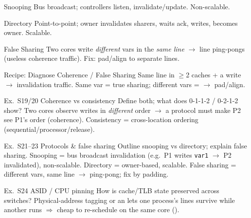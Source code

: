 \multend


\begin{concept}{Snooping}
    Bus broadcast; controllers listen, invalidate/update. Non-scalable.
\end{concept}

\begin{concept}{Directory}
    Point-to-point; owner invalidates sharers, waits ack, writes, becomes owner. Scalable.
\end{concept}

\multend

\begin{definition}{False Sharing}
    Two cores write \emph{different} vars in the \emph{same line} $\to$ line ping-pongs (useless coherence traffic). Fix: pad/align to separate lines.
\end{definition}

\begin{KR}{Recipe: Diagnose Coherence / False Sharing}
    Same line in $\geq$2 caches + a write $\to$ invalidation traffic. Same var = true sharing; different vars =  $\to$ pad/align.
\end{KR}

\begin{example2}{Ex.\ S19/20 Coherence vs consistency}
    Define both; what does 0-1-1-2 / 0-2-1-2 show?
    \tcblower
    Two cores observe writes in \emph{different} order $\to$ a protocol must make P2 see P1's order (coherence). Consistency = cross-location ordering (sequential/processor/release).
\end{example2}

\begin{example2}{Ex.\ S21--23 Protocols \& false sharing}
    Outline snooping vs directory; explain false sharing.
    \tcblower
    Snooping = bus broadcast invalidation (e.g.\ P1 writes \texttt{var1} $\to$ P2 invalidated), non-scalable. Directory = owner-based, scalable. False sharing = different vars, same line $\to$ ping-pong; fix by padding.
\end{example2}

\begin{example2}{Ex.\ S24 ASID / CPU pinning}
    How is cache/TLB state preserved across switches?
    \tcblower
    Physical-address tagging or an  lets one process's lines survive while another runs $\Rightarrow$ cheap to re-schedule on the same core ().
\end{example2}

